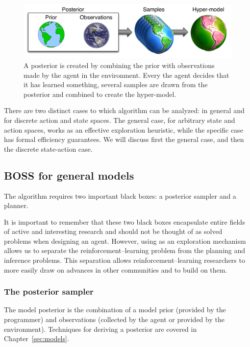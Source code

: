 \begin{figure}[t]
\begin{center}
\includegraphics[width=0.9\linewidth]{hypermodels}
\caption{A posterior is created by combining the prior with observations made by the agent in the environment. Every the agent decides that it has learned something, several samples are drawn from the posterior and combined to create the hyper-model.}
\label{sec:boss:hyper-model}
\end{center}
\end{figure}



There are two distinct cases to which  algorithm can be analyzed: in general and for discrete action and state spaces. The general case, for arbitrary state and action spaces, works as an effective exploration heuristic, while the specific case has formal efficiency guarantees. We will discuss first the general case, and then the discrete state-action case.

\subsection{BOSS for general models} 

The  algorithm requires two important black boxes: a posterior sampler and a planner. 

It is important to remember that these two black boxes encapsulate entire fields of active and interesting research and should not be thought of as solved problems when designing an agent. However, using  as an exploration mechanism allows us to separate the reinforcement--learning problem from the planning and inference problems. This separation allows reinforcement--learning researchers to more easily draw on advances in other communities and to build on them.

\subsubsection{The posterior sampler}

The model posterior is the combination of a model prior (provided by the programmer) and observations (collected by the agent or provided by the environment). Techniques for deriving a posterior are covered in Chapter~\ref{sec:models}.

